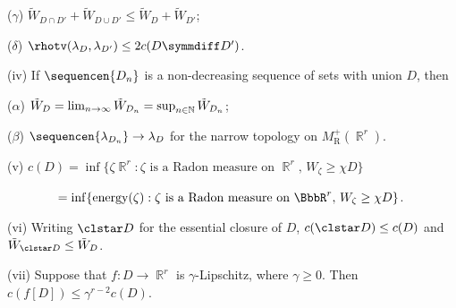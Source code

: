 \qquad($\gamma$) $\tilde W_{D\cap D'}+\tilde W_{D\cup D'}
\le\tilde W_D+\tilde W_{D'}$;

\qquad($\delta$) $\rhotv(\lambda_D,\lambda_{D'})\le 2c(D\symmdiff D')$.

\quad(iv) If $\sequencen{D_n}$ is a non-decreasing sequence of sets with
union $D$, then

\qquad($\alpha$) $\tilde W_D=\lim_{n\to\infty}\tilde W_{D_n}
=\sup_{n\in\Bbb N}\tilde W_{D_n}$;

\qquad($\beta$) $\sequencen{\lambda_{D_n}}\to\lambda_D$ for the narrow
topology on $M^+_{\text{R}}(\BbbR^r)$.

\quad(v) $c(D)
=\inf\{\zeta\BbbR^r:\zeta\text{ is a Radon measure on }\BbbR^r,\,
   W_{\zeta}\ge\chi D\}$

\quad$\phantom{\text{(v) }c(D)}
=\inf\{\energy(\zeta):\zeta\text{ is a Radon measure on }\BbbR^r,\,
   W_{\zeta}\ge\chi D\}$.

\quad(vi) Writing $\clstar D$ for the essential closure of $D$,
$c(\clstar D)\le c(D)$ and $\tilde W_{\clstar D}\le\tilde W_D$.

\quad(vii) Suppose that $f:D\to\BbbR^r$ is $\gamma$-Lipschitz, where
$\gamma\ge 0$.   Then $c(f[D])\le\gamma^{r-2}c(D)$.

